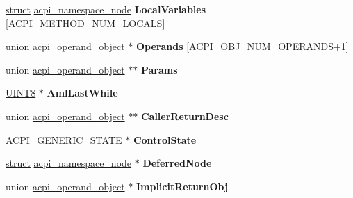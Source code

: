 \begin{DoxyCompactItemize}
\item 
\mbox{\label{structacpi__walk__state_a1eb09aec634f7b848235689cdc2b54ae}} 
\hyperlink{interfacestruct}{struct} \hyperlink{structacpi__namespace__node}{acpi\+\_\+namespace\+\_\+node} {\bfseries Local\+Variables} \mbox{[}A\+C\+P\+I\+\_\+\+M\+E\+T\+H\+O\+D\+\_\+\+N\+U\+M\+\_\+\+L\+O\+C\+A\+LS\mbox{]}
\item 
\mbox{\label{structacpi__walk__state_a15acde57d3bbfce034fbb147cbf29c44}} 
union \hyperlink{unionacpi__operand__object}{acpi\+\_\+operand\+\_\+object} $\ast$ {\bfseries Operands} \mbox{[}A\+C\+P\+I\+\_\+\+O\+B\+J\+\_\+\+N\+U\+M\+\_\+\+O\+P\+E\+R\+A\+N\+DS+1\mbox{]}
\item 
\mbox{\label{structacpi__walk__state_a805728947e3b0fa9e9b85c4092b25804}} 
union \hyperlink{unionacpi__operand__object}{acpi\+\_\+operand\+\_\+object} $\ast$$\ast$ {\bfseries Params}
\item 
\mbox{\label{structacpi__walk__state_a2f240763f09f268a8a49b9802004cc6f}} 
\hyperlink{_processor_bind_8h_ab27e9918b538ce9d8ca692479b375b6a}{U\+I\+N\+T8} $\ast$ {\bfseries Aml\+Last\+While}
\item 
\mbox{\label{structacpi__walk__state_abe349b489e1fea922d49202299cacadb}} 
union \hyperlink{unionacpi__operand__object}{acpi\+\_\+operand\+\_\+object} $\ast$$\ast$ {\bfseries Caller\+Return\+Desc}
\item 
\mbox{\label{structacpi__walk__state_ac84d913df2f5844e318b2bdd787df3b6}} 
\hyperlink{unionacpi__generic__state}{A\+C\+P\+I\+\_\+\+G\+E\+N\+E\+R\+I\+C\+\_\+\+S\+T\+A\+TE} $\ast$ {\bfseries Control\+State}
\item 
\mbox{\label{structacpi__walk__state_aeb23ba59f2023de941c272c65a68d877}} 
\hyperlink{interfacestruct}{struct} \hyperlink{structacpi__namespace__node}{acpi\+\_\+namespace\+\_\+node} $\ast$ {\bfseries Deferred\+Node}
\item 
\mbox{\label{structacpi__walk__state_a0ee30eff60a3095c8458e1b63ce8fe7e}} 
union \hyperlink{unionacpi__operand__object}{acpi\+\_\+operand\+\_\+object} $\ast$ {\bfseries Implicit\+Return\+Obj}

\end{DoxyCompactItemize}
